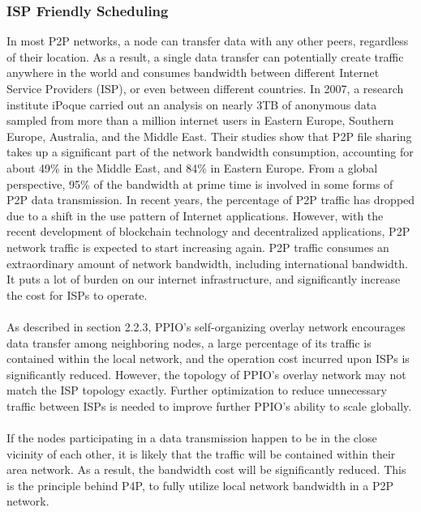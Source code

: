 \documentclass[10pt,a4paper]{article}
\begin{document}
\subsubsection{ISP Friendly Scheduling}  %
In most P2P networks, a node can transfer data with any other peers, regardless of their location. As a result, a single data transfer can potentially create traffic anywhere in the world and consumes bandwidth between different Internet Service Providers (ISP), or even between different countries. In 2007, a research institute iPoque carried out an analysis on nearly 3TB of anonymous data sampled from more than a million internet users in Eastern Europe, Southern Europe, Australia, and the Middle East. \cite{article26}Their studies show that P2P file sharing takes up a significant part of the network bandwidth consumption, accounting for about 49\% in the Middle East, and 84\% in Eastern Europe. From a global perspective, 95\% of the bandwidth at prime time is involved in some forms of P2P data transmission. In recent years, the percentage of P2P traffic has dropped due to a shift in the use pattern of Internet applications. However, with the recent development of blockchain technology and decentralized applications, P2P network traffic is expected to start increasing again. P2P traffic consumes an extraordinary amount of network bandwidth, including international bandwidth. It puts a lot of burden on our internet infrastructure, and significantly increase the cost for ISPs to operate.
\vspace{-0.5em}
 \\ \\As described in section 2.2.3, PPIO’s self-organizing overlay network encourages data transfer among neighboring nodes, a large percentage of its traffic is contained within the local network, and the operation cost incurred upon ISPs is significantly reduced. However, the  topology of PPIO’s overlay network may not match the ISP topology exactly. Further optimization to reduce unnecessary traffic between ISPs is needed to improve further PPIO’s ability to scale globally.
 \vspace{-0.5em}
 \\ \\If the nodes participating in a data transmission happen to be in the close vicinity of each other, it is likely that the traffic will be contained within their area network. As a result, the bandwidth cost will be significantly reduced. This is the principle behind P4P, to fully utilize local network bandwidth in a P2P network.  
\end{document}
